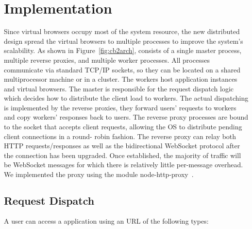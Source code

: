 \chapter{Implementation}
\label{ch:impl}

\newarchitectureoverview{}

Since virtual browsers occupy most of the system resource, the new
distributed design spread the virtual browsers to multiple processes
to improve the system's scalability.
As shown in Figure~\ref{fig:cb2arch}, \cbtwo consists of a
single master process, multiple reverse proxies, and multiple worker
processes. All processes communicate via standard TCP/IP sockets, so they can
be located on a shared multiprocessor machine or in a cluster. The workers
host application instances and virtual browsers. The master is responsible for
the request dispatch logic which decides how to distribute the client load to
workers. The actual dispatching is implemented by the reverse proxies, they
forward users' requests to workers and copy workers' responses back to users.
The reverse proxy processes are bound to the socket that accepts client
requests, allowing the OS to distribute pending client connections in a round-
robin fashion. The reverse proxy can relay both HTTP requests/responses as
well as the bidirectional WebSocket protocol after the connection has been
upgraded.  Once established, the majority of traffic will be WebSocket
messages for which there is relatively little per-message overhead.  We
implemented the proxy using the \nodejs{} module node-http-proxy~\cite{nodeproxy}.




\section{Request Dispatch}
\label{sec:reqdis}
A user can access a \cb{} application using an URL of the following types:

